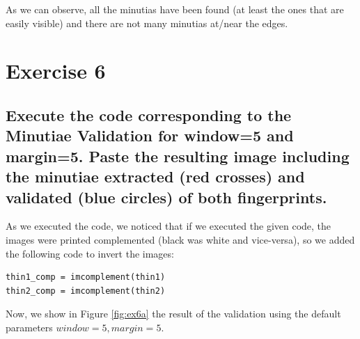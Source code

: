 \documentclass[a4paper]{article}
\begin{document}
As we can observe, all the minutias have been found (at least the ones that are easily visible) and there are not many minutias at/near the edges.


\section{Exercise 6}

\subsection{ Execute the code corresponding to the Minutiae Validation for window=5 and margin=5.  Paste the resulting image including the minutiae extracted (red crosses) and validated (blue circles) of both fingerprints. }

As we executed the code, we noticed that if we executed the given code, the images were printed complemented (black was white and vice-versa), so we added the following code to invert the images:
\begin{verbatim}
thin1_comp = imcomplement(thin1)
thin2_comp = imcomplement(thin2)
\end{verbatim}

Now, we show in Figure \ref{fig:ex6a} the result of the validation using the default parameters \(window = 5, margin = 5\).
\end{document}
